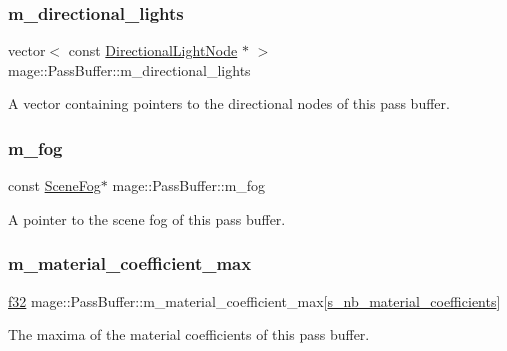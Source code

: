 \subsubsection{\texorpdfstring{m\+\_\+directional\+\_\+lights}{m\_directional\_lights}}
{\footnotesize\ttfamily vector$<$ const \hyperlink{namespacemage_a7637b5351fc0f66a10badd80ebb35899}{Directional\+Light\+Node} $\ast$ $>$ mage\+::\+Pass\+Buffer\+::m\+\_\+directional\+\_\+lights\hspace{0.3cm}{\ttfamily [private]}}

A vector containing pointers to the directional nodes of this pass buffer. \hypertarget{structmage_1_1_pass_buffer_a3691cc52fe3bc5f1c86bf0dad36061d8}{}\label{structmage_1_1_pass_buffer_a3691cc52fe3bc5f1c86bf0dad36061d8} 
\subsubsection{\texorpdfstring{m\+\_\+fog}{m\_fog}}
{\footnotesize\ttfamily const \hyperlink{structmage_1_1_scene_fog}{Scene\+Fog}$\ast$ mage\+::\+Pass\+Buffer\+::m\+\_\+fog\hspace{0.3cm}{\ttfamily [private]}}

A pointer to the scene fog of this pass buffer. \hypertarget{structmage_1_1_pass_buffer_a3e054213536045024e46037fb926d39c}{}\label{structmage_1_1_pass_buffer_a3e054213536045024e46037fb926d39c} 
\subsubsection{\texorpdfstring{m\+\_\+material\+\_\+coefficient\+\_\+max}{m\_material\_coefficient\_max}}
{\footnotesize\ttfamily \hyperlink{namespacemage_a6a44ad388483959dc4dff9f2aef91431}{f32} mage\+::\+Pass\+Buffer\+::m\+\_\+material\+\_\+coefficient\+\_\+max\mbox{[}\hyperlink{structmage_1_1_pass_buffer_a453e18abdf29c4ebb08d9e002a952bf2}{s\+\_\+nb\+\_\+material\+\_\+coefficients}\mbox{]}\hspace{0.3cm}{\ttfamily [private]}}

The maxima of the material coefficients of this pass buffer. \hypertarget{structmage_1_1_pass_buffer_a35ef8d7b14bf3088813d72de732b149e}{}\label{structmage_1_1_pass_buffer_a35ef8d7b14bf3088813d72de732b149e} 
